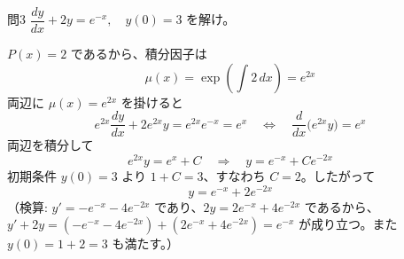 \documentclass[a4paper,11pt]{article}
\begin{document}
\clearpage
\begin{mondaiboxS}{問3}
$\dfrac{dy}{dx} + 2y = e^{-x}, \quad y(0) = 3$ を解け。
\end{mondaiboxS}
\kaitou
$P(x) = 2$ であるから、積分因子は
\[
\mu(x) = \exp\left(\int 2\,dx\right) = e^{2x}
\]
両辺に $\mu(x) = e^{2x}$ を掛けると
\[
e^{2x}\frac{dy}{dx} + 2e^{2x}y = e^{2x}e^{-x} = e^{x}
\quad\Longleftrightarrow\quad
\frac{d}{dx}\bigl(e^{2x}y\bigr) = e^{x}
\]
両辺を積分して
\[
e^{2x}y = e^{x} + C
\quad\Longrightarrow\quad
y = e^{-x} + Ce^{-2x}
\]
初期条件 $y(0) = 3$ より $1 + C = 3$、すなわち $C = 2$。したがって
\[
\boxed{\; y = e^{-x} + 2e^{-2x} \;}
\]
（検算: $y' = -e^{-x} - 4e^{-2x}$ であり、$2y = 2e^{-x} + 4e^{-2x}$ であるから、$y' + 2y = (-e^{-x}-4e^{-2x}) + (2e^{-x}+4e^{-2x}) = e^{-x}$ が成り立つ。また $y(0) = 1 + 2 = 3$ も満たす。）
\end{document}
